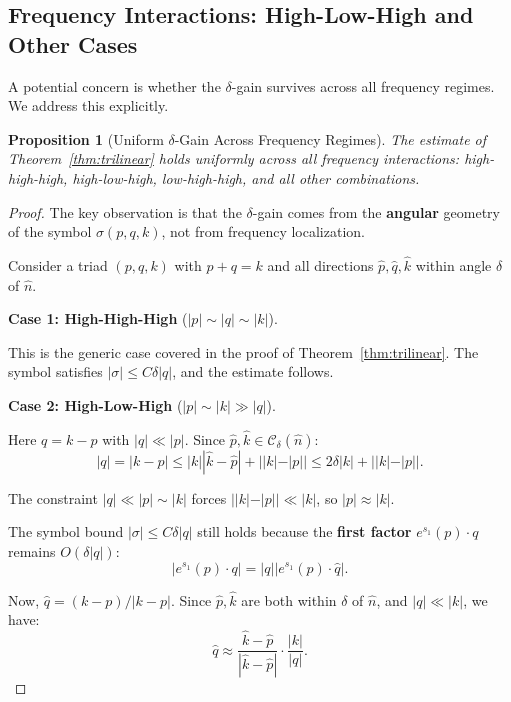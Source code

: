 \documentclass[11pt]{article}
\newtheorem{proposition}[theorem]{Proposition}
\theoremstyle{definition}
\begin{document}
\subsection{Frequency Interactions: High-Low-High and Other Cases}\label{sec:freq}

A potential concern is whether the $\delta$-gain survives across all frequency regimes. We address this explicitly.

\begin{proposition}[Uniform $\delta$-Gain Across Frequency Regimes]\label{prop:freq-uniform}
The estimate of Theorem~\ref{thm:trilinear} holds uniformly across all frequency interactions: high-high-high, high-low-high, low-high-high, and all other combinations.
\end{proposition}

\begin{proof}
The key observation is that the $\delta$-gain comes from the \textbf{angular} geometry of the symbol $\sigma(p,q,k)$, not from frequency localization.

Consider a triad $(p, q, k)$ with $p + q = k$ and all directions $\hat{p}, \hat{q}, \hat{k}$ within angle $\delta$ of $\hat{n}$.

\textbf{Case 1: High-High-High} ($|p| \sim |q| \sim |k|$).

This is the generic case covered in the proof of Theorem~\ref{thm:trilinear}. The symbol satisfies $|\sigma| \leq C\delta|q|$, and the estimate follows.

\textbf{Case 2: High-Low-High} ($|p| \sim |k| \gg |q|$).

Here $q = k - p$ with $|q| \ll |p|$. Since $\hat{p}, \hat{k} \in \mathcal{C}_\delta(\hat{n})$:
\begin{equation}
|q| = |k - p| \leq |k||\hat{k} - \hat{p}| + ||k| - |p|| \leq 2\delta |k| + ||k| - |p||.
\end{equation}

The constraint $|q| \ll |p| \sim |k|$ forces $||k| - |p|| \ll |k|$, so $|p| \approx |k|$.

The symbol bound $|\sigma| \leq C\delta|q|$ still holds because the \textbf{first factor} $e^{s_1}(p) \cdot q$ remains $O(\delta|q|)$:
\begin{equation}
|e^{s_1}(p) \cdot q| = |q| |e^{s_1}(p) \cdot \hat{q}|.
\end{equation}

Now, $\hat{q} = (k-p)/|k-p|$. Since $\hat{p}, \hat{k}$ are both within $\delta$ of $\hat{n}$, and $|q| \ll |k|$, we have:
\begin{equation}
\hat{q} \approx \frac{\hat{k} - \hat{p}}{|\hat{k} - \hat{p}|} \cdot \frac{|k|}{|q|}.
\end{equation}


\end{proof}
\end{document}

